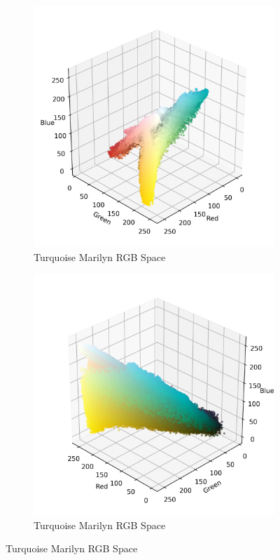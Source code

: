 \documentclass{article}
\begin{document}
\begin{figure}[ht]
  \centering
  \begin{subfigure}{0.45\textwidth}
    \includegraphics[width=\textwidth]{main_files/figure-latex/4_9_turq_marilyn_original_scatter.jpg}
    \caption{Turquoise Marilyn RGB Space}
    \label{fig:4_9_turq_marilyn_original_scatter}
  \end{subfigure}
  \hfill
  \begin{subfigure}{0.45\textwidth}
    \includegraphics[width=\textwidth]{main_files/figure-latex/4_10_turq_marilyn_original_scatter.jpg}
    \caption{Turquoise Marilyn RGB Space}
    \label{fig:4_10_turq_marilyn_original_scatter}
  \end{subfigure}
  \label{fig:turq_marilyn_original_scatter_1}
\end{figure}
\end{document}
